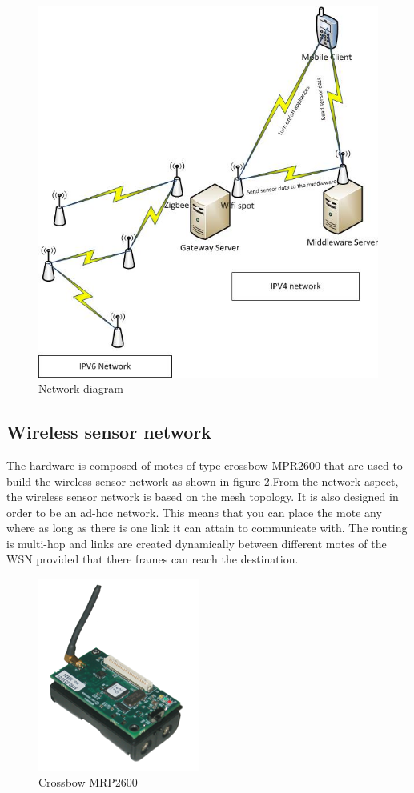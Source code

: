 \documentclass[conference]{IEEEtran}
\begin{document}
\begin{figure}[htbp]
\centering
\includegraphics[scale=0.5]{images/network_diagram.jpg}
\caption{Network diagram}
\label{fig:network}
\end{figure}

\subsection{Wireless sensor network}
The hardware is composed of motes of type crossbow MPR2600 that are used to build the wireless sensor network as shown in figure 2.From the network aspect, the wireless sensor network is based on the mesh topology. It is also designed in order to be an ad-hoc network. This means that you can place the mote any where as long as there is one link it can attain to communicate with. The routing is multi-hop and links are created dynamically between different motes of the WSN provided that there frames can reach the destination.

\begin{figure}[htbp]
\centering
\includegraphics[scale=0.5]{images/micaz.png}
\caption{Crossbow MRP2600}
\label{fig:micaz}
\end{figure}
\end{document}

